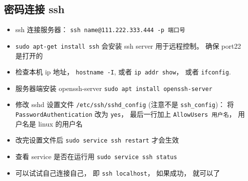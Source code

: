 
\begin{issues}
\issueDraft
\end{issues}

\subsection{密码连接 ssh}
\begin{itemize}
\item ssh 连接服务器： \verb|ssh name@111.222.333.444 -p 端口号|
\item \verb`sudo apt-get install ssh` 会安装 ssh server 用于远程控制。 确保 port22 是打开的
\item 检查本机 ip 地址， \verb`hostname -I`, 或者 \verb`ip addr show`， 或者 \verb|ifconfig|.
\item 服务器端安装 openssh-server \verb`sudo apt install openssh-server`
\item 修改 sshd 设置文件 \verb`/etc/ssh/sshd_config` (注意不是 \verb`ssh_config`)： 将 \verb`PasswordAuthentication` 改为 \verb`yes`， 最后一行加上 \verb`AllowUsers 用户名`， 用户名是 linux 的用户名
\item 改完设置文件后 \verb`sudo service ssh restart` 才会生效
\item 查看 service 是否在运行用  \verb`sudo service ssh status`
\item 可以试试自己连接自己， 即 \verb`ssh localhost`， 如果成功， 就可以了
\end{itemize}

